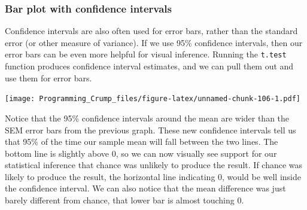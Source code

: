 \documentclass[]{book}
\newenvironment{Shaded}{\begin{snugshade}}{\end{snugshade}}
\newcommand{\KeywordTok}[1]{\textcolor[rgb]{0.13,0.29,0.53}{\textbf{{#1}}}}
\newcommand{\DataTypeTok}[1]{\textcolor[rgb]{0.13,0.29,0.53}{{#1}}}
\newcommand{\DecValTok}[1]{\textcolor[rgb]{0.00,0.00,0.81}{{#1}}}
\newcommand{\StringTok}[1]{\textcolor[rgb]{0.31,0.60,0.02}{{#1}}}
\newcommand{\NormalTok}[1]{{#1}}
\theoremstyle{definition}
\theoremstyle{definition}
\theoremstyle{definition}
\theoremstyle{remark}
\begin{document}
\subsubsection{Bar plot with confidence
intervals}\label{bar-plot-with-confidence-intervals}

Confidence intervals are also often used for error bars, rather than the
standard error (or other measure of variance). If we use 95\% confidence
intervals, then our error bars can be even more helpful for visual
inference. Running the \texttt{t.test} function produces confidence
interval estimates, and we can pull them out and use them for error
bars.

\begin{Shaded}
\end{Shaded}

\texttt{[image: Programming\_Crump\_files/figure-latex/unnamed-chunk-106-1.pdf]}

Notice that the 95\% confidence intervals around the mean are wider than
the SEM error bars from the previous graph. These new confidence
intervals tell us that 95\% of the time our sample mean will fall
between the two lines. The bottom line is slightly above 0, so we can
now visually see support for our statistical inference that chance was
unlikely to produce the result. If chance was likely to produce the
result, the horizontal line indicating 0, would be well inside the
confidence interval. We can also notice that the mean difference was
just barely different from chance, that lower bar is almost touching 0.
\end{document}
